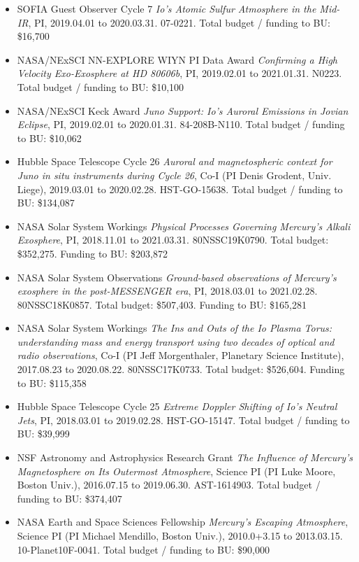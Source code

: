 \documentclass[12pt]{report}
\begin{document}
\begin{itemize}
 \item SOFIA Guest Observer Cycle 7 {\it Io's Atomic Sulfur Atmosphere in the Mid-IR}, PI, 2019.04.01 to 2020.03.31. 07-0221. Total budget / funding to BU: \$16,700
 \item NASA/NExSCI NN-EXPLORE WIYN PI Data Award {\it Confirming a High Velocity Exo-Exosphere at HD 80606b}, PI, 2019.02.01 to 2021.01.31. N0223. Total budget / funding to BU: \$10,100
 \item NASA/NExSCI Keck Award {\it Juno Support: Io's Auroral Emissions in Jovian Eclipse}, PI, 2019.02.01 to 2020.01.31. 84-208B-N110. Total budget / funding to BU: \$10,062
 \item Hubble Space Telescope Cycle 26 {\it Auroral and magnetospheric context for Juno in situ instruments during Cycle 26}, Co-I (PI Denis Grodent, Univ. Liege), 2019.03.01 to 2020.02.28. HST-GO-15638. Total budget / funding to BU: \$134,087
 \item NASA Solar System Workings  {\it Physical Processes Governing Mercury's Alkali Exosphere}, PI, 2018.11.01 to 2021.03.31. 80NSSC19K0790. Total budget: \$352,275. Funding to BU: \$203,872
 \item NASA Solar System Observations {\it Ground-based observations of Mercury's exosphere in the post-MESSENGER era}, PI, 2018.03.01 to 2021.02.28. 80NSSC18K0857. Total budget: \$507,403. Funding to BU: \$165,281
 \item NASA Solar System Workings {\it The Ins and Outs of the Io Plasma Torus: understanding mass and energy transport using two decades of optical and radio observations}, Co-I (PI Jeff Morgenthaler, Planetary Science Institute), 2017.08.23 to 2020.08.22. 80NSSC17K0733. Total budget: \$526,604. Funding to BU: \$115,358
 \item Hubble Space Telescope Cycle 25 {\it Extreme Doppler Shifting of Io's Neutral Jets}, PI, 2018.03.01 to 2019.02.28. HST-GO-15147. Total budget / funding to BU: \$39,999
 \item NSF Astronomy and Astrophysics Research Grant {\it The Influence of Mercury's Magnetosphere on Its Outermost Atmosphere}, Science PI (PI Luke Moore, Boston Univ.), 2016.07.15 to 2019.06.30. AST-1614903. Total budget / funding to BU: \$374,407
 \item NASA Earth and Space Sciences Fellowship {\it Mercury's Escaping Atmosphere}, Science PI (PI Michael Mendillo, Boston Univ.), 2010.0+3.15 to 2013.03.15. 10-Planet10F-0041. Total budget / funding to BU: \$90,000
 \end{itemize}
\vspace{2 mm}
\end{document}
